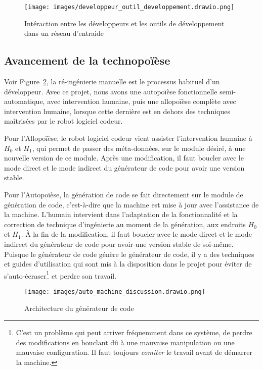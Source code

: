 \begin{figure}
\centering
\texttt{[image: images/developpeur\_outil\_developpement.drawio.png]}
\caption{Intéraction entre les développeurs et les outils de développement dans un réseau d'entraide}
\label{fig:dia_outil_dev_reseau_entraide}
\end{figure}

\subsection{Avancement de la technopoïèse}\label{avancement_technopoiese}
Voir Figure~\ref{fig:dia_auto_machine_discussion}, la ré-ingénierie manuelle est le processus habituel d'un développeur. Avec ce projet, nous avons une autopoïèse fonctionnelle semi-automatique, avec intervention humaine, puis une allopoïèse complète avec intervention humaine, lorsque cette dernière est en dehors des techniques maîtrisées par le robot logiciel codeur.

Pour l'Allopoïèse, le robot logiciel codeur vient assister l'intervention humaine à $H_0$ et $H_1$, qui permet de passer des méta-données, sur le module désiré, à une nouvelle version de ce module. Après une modification, il faut boucler avec le mode direct et le mode indirect du générateur de code pour avoir une version stable.

Pour l'Autopoïèse, la génération de code se fait directement sur le module de génération de code, c'est-à-dire que la machine est mise à jour avec l'assistance de la machine. L'humain intervient dans l'adaptation de la fonctionnalité et la correction de technique d'ingénierie au moment de la génération, aux endroits $H_0$ et $H_1$. À la fin de la modification, il faut boucler avec le mode direct et le mode indirect du générateur de code pour avoir une version stable de soi-même. Puisque le générateur de code génère le générateur de code, il y a des techniques et guides d'utilisation qui sont mis à la disposition dans le projet pour éviter de s'auto-écraser\footnote{C'est un problème qui peut arriver fréquemment dans ce système, de perdre des modifications en bouclant dû à une mauvaise manipulation ou une mauvaise configuration. Il faut toujours \textit{comiter} le travail avant de démarrer la machine.} et perdre son travail.

\begin{figure}
\centering
\texttt{[image: images/auto\_machine\_discussion.drawio.png]}
\caption{Architecture du générateur de code}
\label{fig:dia_auto_machine_discussion}
\end{figure}

